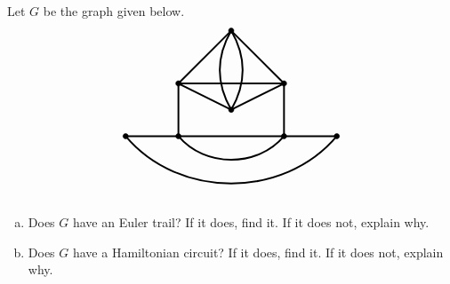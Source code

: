 \documentclass[11pt,letterpaper]{article}
\begin{document}
\newpage



 Let $G$ be the graph given below.
	\[
	\begin{tikzpicture}[scale=1.5]
	\draw[line width=0.05cm] (-2,0) to (2,0);
	\draw[line width=0.05cm] (-1,0) to (-1,1);
	\draw[line width=0.05cm] (1,0) to (1,1);
	\draw[line width=0.05cm] (-1,1) to (1,1);
	\draw[line width=0.05cm] (-1,1) to (0,2);
	\draw[line width=0.05cm] (1,1) to (0,2);
	\draw[line width=0.05cm] (-1,1) to (0,0.5);
	\draw[line width=0.05cm] (1,1) to (0,0.5);
	\draw[line width=0.05cm, bend right=50] (-1,0) to (1,0);
	\draw[line width=0.05cm, bend right=50] (-2,0) to (2,0);
	\draw[line width=0.05cm, bend right= 30] (0,2) to (0,0.5);
	\draw[line width=0.05cm, bend left= 30] (0,2) to (0,0.5);
	
	\draw[fill= black] (0,2) circle (0.05);
	\draw[fill= black] (-1,1) circle (0.05);
	\draw[fill= black] (1,1) circle (0.05);
	\draw[fill= black] (0,0.5) circle (0.05);
	\draw[fill= black] (-2,0) circle (0.05);
	\draw[fill= black] (-1,0) circle (0.05);
	\draw[fill= black] (1,0) circle (0.05);
	\draw[fill= black] (2,0) circle (0.05);
	\end{tikzpicture}
	\]
\begin{enumerate}[(a)]
\item Does $G$ have an Euler trail? If it does, find it. If it does not, explain why. 
\item Does $G$ have a Hamiltonian circuit? If it does, find it. If it does not, explain why. 
\end{enumerate} \pspace
\end{document}
